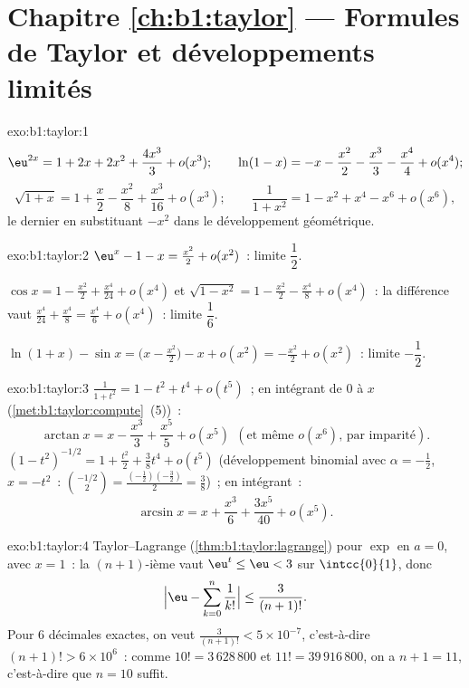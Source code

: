 \section*{Chapitre \ref{ch:b1:taylor} --- Formules de Taylor et
développements limités}

\begin{solution}{exo:b1:taylor:1}
\[
\eu^{2x} = 1 + 2x + 2x^2 + \frac{4x^3}{3} + o(x^3);
\qquad
\ln(1 - x) = -x - \frac{x^2}{2} - \frac{x^3}{3} - \frac{x^4}{4} +
o(x^4);
\]
\[
\sqrt{1+x} = 1 + \frac x2 - \frac{x^2}{8} + \frac{x^3}{16} + o(x^3);
\qquad
\frac{1}{1 + x^2} = 1 - x^2 + x^4 - x^6 + o(x^6),
\]
le dernier en substituant $-x^2$ dans le développement géométrique.
\end{solution}

\begin{solution}{exo:b1:taylor:2}
$\eu^x - 1 - x = \frac{x^2}{2} + o(x^2)$~: limite $\dfrac12$.

$\cos x = 1 - \frac{x^2}{2} + \frac{x^4}{24} + o(x^4)$ et
$\sqrt{1 - x^2} = 1 - \frac{x^2}{2} - \frac{x^4}{8} + o(x^4)$~:
la différence vaut $\frac{x^4}{24} + \frac{x^4}{8} = \frac{x^4}{6} +
o(x^4)$~: limite $\dfrac16$.

$\ln(1+x) - \sin x = \bigl(x - \frac{x^2}{2}\bigr) - x + o(x^2) =
-\frac{x^2}{2} + o(x^2)$~: limite $-\dfrac12$.
\end{solution}

\begin{solution}{exo:b1:taylor:3}
$\frac{1}{1+t^2} = 1 - t^2 + t^4 + o(t^5)$~; en intégrant de $0$ à
$x$ (\cref{met:b1:taylor:compute}~(5))~:
\[
\arctan x = x - \frac{x^3}{3} + \frac{x^5}{5} + o(x^5)\ \ (\text{et
même }o(x^6)\text{, par imparité}).
\]
$(1 - t^2)^{-1/2} = 1 + \frac{t^2}{2} + \frac38 t^4 + o(t^5)$
(développement binomial avec $\alpha = -\frac12$, $x = -t^2$~:
$\binom{-1/2}{2} = \frac{(-\frac12)(-\frac32)}{2} = \frac38$)~;
en intégrant~:
\[
\arcsin x = x + \frac{x^3}{6} + \frac{3x^5}{40} + o(x^5) .
\]
\end{solution}

\begin{solution}{exo:b1:taylor:4}
Taylor--Lagrange (\cref{thm:b1:taylor:lagrange}) pour $\exp$ en $a =
0$, avec $x = 1$~: la  $(n+1)$-ième vaut $\eu^t \leq \eu < 3$
sur $\intcc{0}{1}$, donc
\[
\Bigl|\eu - \sum_{k=0}^{n} \frac{1}{k!}\Bigr| \leq
\frac{3}{(n+1)!} .
\]
Pour $6$ décimales exactes, on veut $\frac{3}{(n+1)!} < 5\times
10^{-7}$, c'est-à-dire $(n+1)! > 6\times 10^{6}$~: comme $10! =
3\,628\,800$ et $11! = 39\,916\,800$, on a $n + 1 = 11$,
c'est-à-dire que $n = 10$ suffit.
\end{solution}


